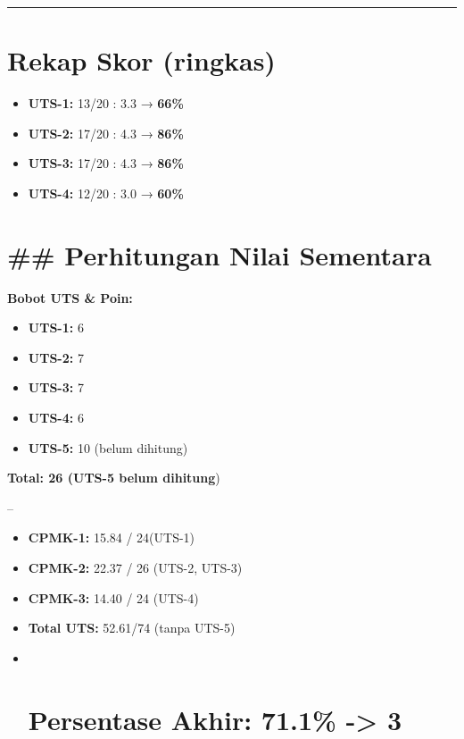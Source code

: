 \documentclass[
  letterpaper,
  DIV=11,
  numbers=noendperiod]{scrreprt}
\providecommand{\tightlist}{%
  \setlength{\itemsep}{0pt}\setlength{\parskip}{0pt}}
\begin{document}
\begin{center}\rule{0.5\linewidth}{0.5pt}\end{center}

\section{Rekap Skor (ringkas)}\label{rekap-skor-ringkas}

\begin{itemize}
\tightlist
\item
  \textbf{UTS-1:} 13/20 : 3.3 → \textbf{66\%}
\item
  \textbf{UTS-2:} 17/20 : 4.3 → \textbf{86\%}
\item
  \textbf{UTS-3:} 17/20 : 4.3 → \textbf{86\%}
\item
  \textbf{UTS-4:} 12/20 : 3.0 → \textbf{60\%}
\end{itemize}

\section{\#\# Perhitungan Nilai
Sementara}\label{perhitungan-nilai-sementara}

\textbf{Bobot UTS \& Poin:}

\begin{itemize}
\item
  \textbf{UTS-1:} 6
\item
  \textbf{UTS-2:} 7
\item
  \textbf{UTS-3:} 7
\item
  \textbf{UTS-4:} 6
\item
  \textbf{UTS-5:} 10 (belum dihitung)
\end{itemize}

\textbf{Total: 26 (UTS-5 belum dihitung})

--

\begin{itemize}
\item
  \textbf{CPMK-1:} 15.84 / 24(UTS-1)
\item
  \textbf{CPMK-2:} 22.37 / 26 (UTS-2, UTS-3)
\item
  \textbf{CPMK-3:} 14.40 / 24 (UTS-4)
\item
  \textbf{Total UTS:} 52.61/74 (tanpa UTS-5)
\item ~
  \section{\texorpdfstring{\textbf{Persentase Akhir:} 71.1\%
  -\textgreater{}
  3}{Persentase Akhir: 71.1\% -\textgreater{} 3}}\label{persentase-akhir-71.1---3}
\end{itemize}
\end{document}
